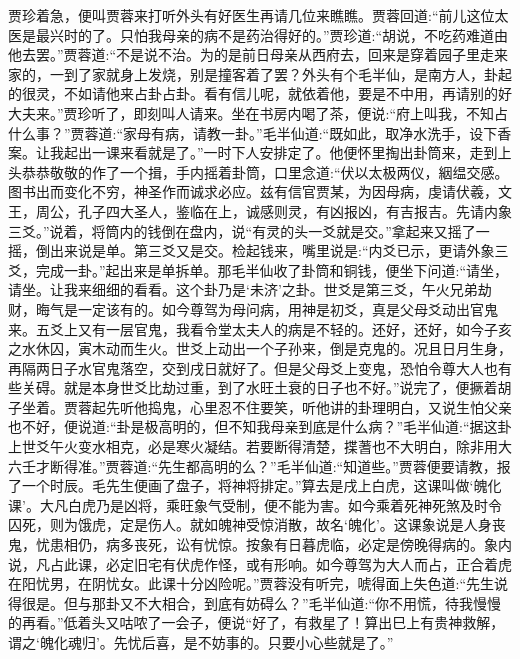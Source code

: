 \begin{parag}
    贾珍着急，便叫贾蓉来打听外头有好医生再请几位来瞧瞧。贾蓉回道:“前儿这位太医是最兴时的了。只怕我母亲的病不是药治得好的。”贾珍道:“胡说，不吃药难道由他去罢。”贾蓉道:“不是说不治。为的是前日母亲从西府去，回来是穿着园子里走来家的，一到了家就身上发烧，别是撞客着了罢？外头有个毛半仙，是南方人，卦起的很灵，不如请他来占卦占卦。看有信儿呢，就依着他，要是不中用，再请别的好大夫来。”贾珍听了，即刻叫人请来。坐在书房内喝了茶，便说:“府上叫我，不知占什么事？”贾蓉道:“家母有病，请教一卦。”毛半仙道:“既如此，取净水洗手，设下香案。让我起出一课来看就是了。”一时下人安排定了。他便怀里掏出卦筒来，走到上头恭恭敬敬的作了一个揖，手内摇着卦筒，口里念道:“伏以太极两仪，絪缊交感。图书出而变化不穷，神圣作而诚求必应。兹有信官贾某，为因母病，虔请伏羲，文王，周公，孔子四大圣人，鉴临在上，诚感则灵，有凶报凶，有吉报吉。先请内象三爻。”说着，将筒内的钱倒在盘内，说“有灵的头一爻就是交。”拿起来又摇了一摇，倒出来说是单。第三爻又是交。检起钱来，嘴里说是:“内爻已示，更请外象三爻，完成一卦。”起出来是单拆单。那毛半仙收了卦筒和铜钱，便坐下问道:“请坐，请坐。让我来细细的看看。这个卦乃是‘未济’之卦。世爻是第三爻，午火兄弟劫财，晦气是一定该有的。如今尊驾为母问病，用神是初爻，真是父母爻动出官鬼来。五爻上又有一层官鬼，我看令堂太夫人的病是不轻的。还好，还好，如今子亥之水休囚，寅木动而生火。世爻上动出一个子孙来，倒是克鬼的。况且日月生身，再隔两日子水官鬼落空，交到戌日就好了。但是父母爻上变鬼，恐怕令尊大人也有些关碍。就是本身世爻比劫过重，到了水旺土衰的日子也不好。”说完了，便撅着胡子坐着。贾蓉起先听他捣鬼，心里忍不住要笑，听他讲的卦理明白，又说生怕父亲也不好，便说道:“卦是极高明的，但不知我母亲到底是什么病？”毛半仙道:“据这卦上世爻午火变水相克，必是寒火凝结。若要断得清楚，揲蓍也不大明白，除非用大六壬才断得准。”贾蓉道:“先生都高明的么？”毛半仙道:“知道些。”贾蓉便要请教，报了一个时辰。毛先生便画了盘子，将神将排定。”算去是戌上白虎，这课叫做‘魄化课’。大凡白虎乃是凶将，乘旺象气受制，便不能为害。如今乘着死神死煞及时令囚死，则为饿虎，定是伤人。就如魄神受惊消散，故名‘魄化’。这课象说是人身丧鬼，忧患相仍，病多丧死，讼有忧惊。按象有日暮虎临，必定是傍晚得病的。象内说，凡占此课，必定旧宅有伏虎作怪，或有形响。如今尊驾为大人而占，正合着虎在阳忧男，在阴忧女。此课十分凶险呢。”贾蓉没有听完，唬得面上失色道:“先生说得很是。但与那卦又不大相合，到底有妨碍么？”毛半仙道:“你不用慌，待我慢慢的再看。”低着头又咕哝了一会子，便说“好了，有救星了！算出巳上有贵神救解，谓之‘魄化魂归’。先忧后喜，是不妨事的。只要小心些就是了。”
\end{parag}


